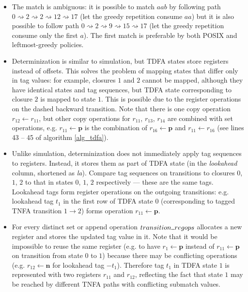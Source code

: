 \documentclass[]{article}
\newcommand{\Xund}{\rule{.5em}{.5pt}}
\begin{document}
\begin{itemize}
\item[\ding{212}]
The match is ambiguous: it is possible to match $aab$ by following path $0 \!\rightsquigarrow\! 2 \!\rightsquigarrow\! 2 \!\rightsquigarrow\! 12 \!\rightsquigarrow\! 17$
(let the greedy repetition consume $aa$)
but it is also possible to follow path $0 \!\rightsquigarrow\! 2 \!\rightsquigarrow\! 9 \!\rightsquigarrow\! 15 \!\rightsquigarrow\! 17$
(let the greedy repetition consume only the first $a$).
The first match is preferable by both POSIX and leftmost-greedy policies.
\medskip

\item[\ding{212}]
Determinization is similar to simulation, but TDFA states store registers instead of offsets.
This solves the problem of mapping states that differ only in tag values:
for example, closures $1$ and $2$ cannot be mapped, although they have identical states and tag sequences,
but TDFA state corresponding to closure $2$ is mapped to state $1$.
This is possible due to the register operations on the dashed backward transition.
Note that there is one copy operation $r_{12} \leftarrow r_{11}$,
but other copy operations for $r_{11}$, $r_{13}$, $r_{14}$ are combined with set operations,
e.g. $r_{11} \leftarrow \mathbf{p}$ is the combination of $r_{16} \leftarrow \mathbf{p}$ and $r_{11} \leftarrow r_{16}$
(see lines 43 -- 45 of algorithm \ref{alg_tdfa}).
\medskip

\item[\ding{212}]
Unlike simulation, determinization does not immediately apply tag sequences to registers.
Instead, it stores them as part of TDFA state (in the \emph{lookahead} column, shortened as \emph{la}).
Compare tag sequences on transitions to closures $0$, $1$, $2$ to that in states $0$, $1$, $2$ respectively ---
these are the same tags.
Lookahead tags form register operations on the outgoing transitions:
e.g. lookahead tag $t_1$ in the first row of TDFA state $0$
(corresponding to tagged TNFA transition $1 \!\rightarrow\! 2$)
forms operation $r_{11} \leftarrow \mathbf{p}$.
\medskip

\item[\ding{212}]
For every distinct set or append operation $transition \Xund regops$ allocates a new register and stores the updated tag value in it.
Note that it would be impossible to reuse the same register
(e.g. to have $r_{1} \leftarrow \mathbf{p}$ instead of $r_{11} \leftarrow \mathbf{p}$ on transition from state $0$ to $1$)
because there may be conflicting operations
(e.g. $r_{12} \leftarrow \mathbf{n}$ for lookahead tag $-t_1$).
Therefore tag $t_1$ in TDFA state $1$ is represented with two registers $r_{11}$ and $r_{12}$,
reflecting the fact that state $1$ may be reached by different TNFA paths with conflicting submatch values.
\medskip


\end{itemize}
\end{document}
